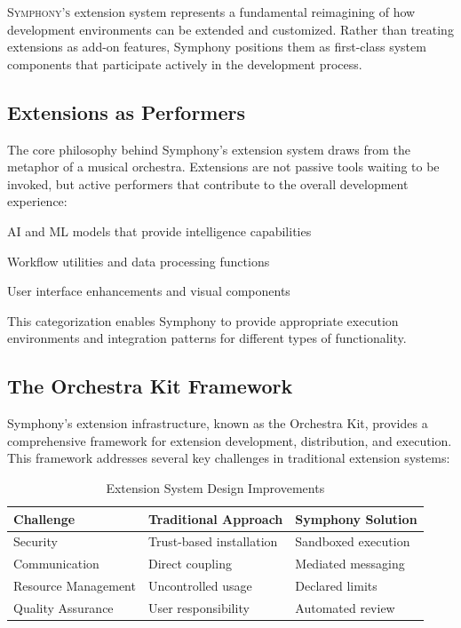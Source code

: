 
\lettrine{S}{ymphony's} extension system represents a fundamental reimagining of how development environments can be extended and customized. Rather than treating extensions as add-on features, Symphony positions them as \textcolor{brandPrimary}{first-class system components} that participate actively in the development process.

\subsection*{Extensions as Performers}

The core philosophy behind Symphony's extension system draws from the metaphor of a musical orchestra. Extensions are not passive tools waiting to be invoked, but active \textcolor{brandSecondary}{performers} that contribute to the overall development experience:

\begin{description}[leftmargin=3cm,labelwidth=2.5cm]
    \item[\textbf{Instruments}] AI and ML models that provide intelligence capabilities
    \item[\textbf{Operators}] Workflow utilities and data processing functions
    \item[\textbf{Motifs}] User interface enhancements and visual components
\end{description}

This categorization enables Symphony to provide appropriate execution environments and integration patterns for different types of functionality.

\subsection*{The Orchestra Kit Framework}

Symphony's extension infrastructure, known as the \textcolor{brandAccent}{Orchestra Kit}, provides a comprehensive framework for extension development, distribution, and execution. This framework addresses several key challenges in traditional extension systems:

\begin{table}[ht]
\centering
\begin{tabular}{@{}lll@{}}
\toprule
\textbf{Challenge} & \textbf{Traditional Approach} & \textbf{Symphony Solution} \\
\midrule
Security & Trust-based installation & Sandboxed execution \\
Communication & Direct coupling & Mediated messaging \\
Resource Management & Uncontrolled usage & Declared limits \\
Quality Assurance & User responsibility & Automated review \\
\bottomrule
\end{tabular}
\caption{Extension System Design Improvements}
\end{table}

